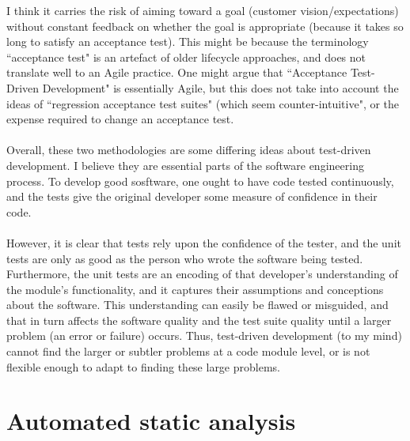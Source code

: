 I think it carries the risk of aiming toward a goal (customer vision/expectations) without constant
feedback on whether the goal is appropriate (because it takes so long to satisfy an acceptance test).
This might be because the terminology ``acceptance test" is an artefact of older lifecycle
approaches, and does not translate well to an Agile practice.
One might argue that ``Acceptance Test-Driven Development" is essentially Agile, but this does not
take into account the ideas of ``regression acceptance test suites" (which seem counter-intuitive",
or the expense required to change an acceptance test.\\
\\
Overall, these two methodologies are some differing ideas about test-driven development.
I believe they are essential parts of the software engineering process.
To develop good sosftware, one ought to have code tested continuously, and the tests give the
original developer some measure of confidence in their code.\\
\\
However, it is clear that tests rely upon the confidence of the tester, and the unit tests are only
as good as the person who wrote the software being tested.
Furthermore, the unit tests are an encoding of that developer's understanding of the module's
functionality, and it captures their assumptions and conceptions about the software.
This understanding can easily be flawed or misguided, and that in turn affects the software quality
and the test suite quality until a larger problem (an error or failure) occurs.
Thus, test-driven development (to my mind) cannot find the larger or subtler problems at a code module level, or is not flexible enough to adapt to
finding these large problems.

\section{Automated static analysis} \label{sec:otherdets:static}


